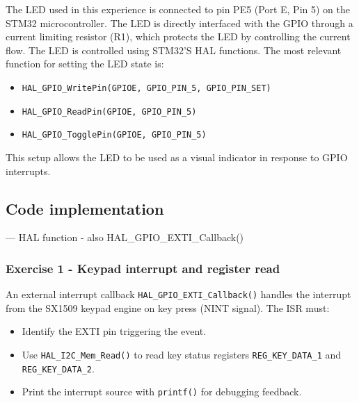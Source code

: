 The LED used in this experience is connected to pin PE5 (Port E, Pin 5) on the STM32 microcontroller. The LED is directly interfaced with the GPIO through a current limiting resistor (R1), which protects the LED by controlling the current flow. 
The LED is controlled using STM32'S HAL functions. The most relevant function for setting the LED state is: 

\begin{itemize}
    \item \texttt{HAL\_GPIO\_WritePin(GPIOE, GPIO\_PIN\_5, GPIO\_PIN\_SET)}
    \item \texttt{HAL\_GPIO\_ReadPin(GPIOE, GPIO\_PIN\_5)}
    \item \texttt{HAL\_GPIO\_TogglePin(GPIOE, GPIO\_PIN\_5)}
\end{itemize}

This setup allows the LED to be used as a visual indicator in response to GPIO interrupts.




\subsection{Code implementation}

--- HAL function - also HAL\_GPIO\_EXTI\_Callback()
    

\subsubsection{Exercise 1 - Keypad interrupt and register read}

An external interrupt callback \texttt{HAL\_GPIO\_EXTI\_Callback()} handles the interrupt from the SX1509 keypad engine on key press (NINT signal). 
The ISR must:

\begin{itemize}
    \item Identify the EXTI pin triggering the event.
    \item Use \texttt{HAL\_I2C\_Mem\_Read()} to read key status registers \texttt{REG\_KEY\_DATA\_1} and \texttt{REG\_KEY\_DATA\_2}.
    \item Print the interrupt source with \texttt{printf()} for debugging feedback.
\end{itemize}

\bigskip

